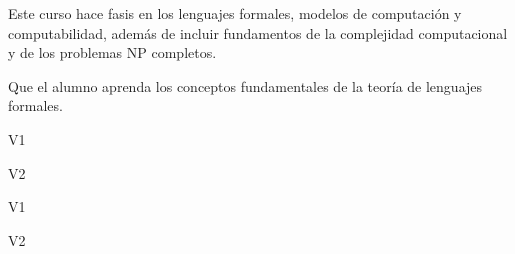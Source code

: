 \begin{syllabus}


\begin{justification}
Este curso hace fasis en los lenguajes formales, modelos de computación y computabilidad, además de incluir fundamentos de la complejidad computacional y de los problemas NP completos.
\end{justification}

\begin{goals}
\item Que el alumno aprenda los conceptos fundamentales de la teoría de lenguajes formales.
\end{goals}

\begin{outcomes}{V1}
    \item {}
    \item {}
    \item {}
\end{outcomes}

\begin{outcomes}{V2}
    \item {}
    \item {}
    \item {}
\end{outcomes}

\begin{competences}{V1}
    \item {} 
    \item {} 
\end{competences}

\begin{competences}{V2}
    \item {} 
    \item {} 
\end{competences}


\end{syllabus}

